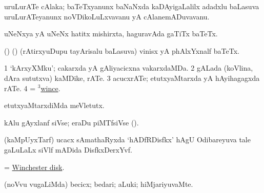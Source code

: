 \bentry
{}
\gl{\nA}
\bmng
uruLurATe cAlaka; baTeTxyanunx baNaNxda kaDAyigaLalilx adadxlu baLasuva uruLurATeyanunx noVDikoLuLxvavanu yA cAlanemADuvavanu. 
\emng
\eentry

\bentry
{}
\gl{\nA} 
\bmng
uNeNxya yA uNeNx hatitx mishirxta, haguravAda gaTiTx baTeTx. 
\emng
\eentry

\bentry
{}
\gl{\nA}
\bmng
(\birx) (\kanmu) (rAtirxyuDupu tayArisalu baLasuva) vinisx yA phAlxYxnalf baTeTx. 
\emng
\eentry

\bentry
{} 
\gl{\nA}
\expl{}
\bmng
\bnum
\num{1} `kArxyXMku'; cakarxda yA gAliyacicxna vakarxdaMDa. 
\num{2} gALada (koVlina, dAra sututxva) kaMDike, rATe. 
\num{3} acucxrATe; etutxyaMtarxda yA hAyihagagxda rATe. 
\num{4} = \hyperlink{wince(3)}{$^3$wince}. 
\enum
\emng
\eentry

\bentry
{} 
\gl{\sakirx}
\bmng
etutxyaMtarxdiMda meVletutx. 
\emng
\eentry

\bentry
{} 
\gl{\nA}
\expl{}
\bmng
kAlu gAyxlanf siVse; eraDu piMTfsiVse (). 
\emng
\eentry

\bentry
{} 
\gl{\nA}
\bmng
(kaMpUyxTarf) ucacx sAmathaRyxda `hADfRDisfkx' hAgU Odibareyuva tale gaLuLaLx siVlf mADida DisfkxDerxYvf. 
\emng
\eentry

\bentry
{}
\gl{\nA}
\bmng
= \hyperlink{Winchester disk}{Winchester disk}. 
\emng
\eentry

\bentry
{}
\gl{\kirxvi}
\bmng
(noVvu \mo vugaLiMda) becicx; bedari; aLuki; hiMjariyuvaMte. 
\emng
\eentry

